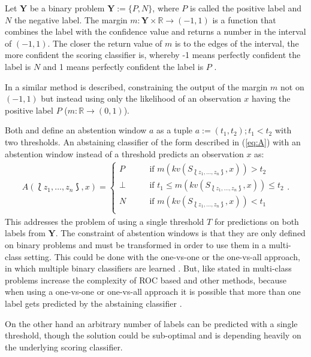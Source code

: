 \documentclass[twoside,11pt]{article}
\def\ds{\Lbag z_1,\dots,z_n \Rbag}
\def\Y{\textbf{Y}}
\begin{document}
Let $\Y$ be a binary problem $\Y := \{P, N\}$,
where $P$ is called the positive label and $N$ the
negative label.
The margin $m: \Y \times \mathbb{R} \rightarrow (-1,1)$ is
a function that combines the label with the confidence
value and returns a number in the interval of $(-1,1)$.
The closer the return value of $m$ is to the edges of the
interval, the more confident the scoring classifier is,
whereby -1 means perfectly confident the label is $N$ and 1
means perfectly confident the label is $P$
\citep[see][]{friedel_et_al_2006}.

In \citet{guan_et_al_2018} a similar method is described,
constraining the output of the margin $m$ not on $(-1,1)$
but instead using only the likelihood of an observation $x$
having the positive label $P$
($m: \mathbb{R} \rightarrow (0,1)$).

Both \citet{friedel_et_al_2006} and \citet{guan_et_al_2018}
define an abstention window $a$ as a tuple
$a := (t_1, t_2); t_1 < t_2$ with two thresholds.
An abstaining classifier of the form described in
(\ref{eq:A}) with an abstention window instead of a
threshold predicts an observation $x$ as:
\begin{align*}
  A(\ds, x) =
    \begin{cases}
      P    &\qquad \text{if } m(kv(S_{\ds}, x)) > t_2 \\
      \bot &\qquad \text{if }
            t_1 \leq m(kv(S_{\ds}, x)) \leq t_2 \\
      N    &\qquad \text{if } m(kv(S_{\ds}, x)) < t_1 \\
    \end{cases}.
\end{align*}
This addresses the problem of using a single threshold $T$
for predictions on both labels from $\Y$.
The constraint of abstention windows is that they are only
defined on binary problems and must be transformed in order
to use them in a multi-class setting.
This could be done with the one-vs-one or the one-vs-all
approach, in which multiple binary classifiers are learned
\citep[see e.g.][Chapter 14.5]{murphy_2012}.
But, like stated in \citet{friedel_2005} multi-class
problems increase the complexity of ROC based and other
methods, because when using a one-vs-one or one-vs-all
approach it is possible that more than one label gets
predicted by the abstaining classifier
\citep[see][]{friedel_2005}.

On the other hand an arbitrary number of labels can be
predicted with a single threshold, though the solution
could be sub-optimal and is depending heavily on the
underlying scoring classifier.
\end{document}
